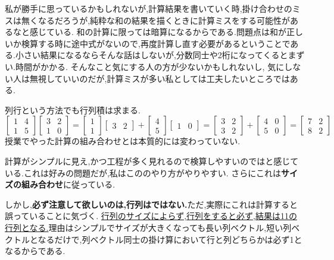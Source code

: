 私が勝手に思っているかもしれないが,計算結果を書いていく時,掛け合わせのミスは無くなるだろうが,純粋な和の結果を描くときに計算ミスをする可能性があるなと感じている.
和の計算に限っては暗算になるからである.問題点は和が正しいか検算する時に途中式がないので,再度計算し直す必要があるということである.小さい結果になるならそんな話はしないが,分数同士や2桁になってくるとまずい.時間がかかる.
そんなこと気にする人の方が少ないかもしれないし,
気にしない人は無視していいのだが,計算ミスが多い私としては工夫したいところではある.\medskip\\
\begin{framed}
列\times 行という方法でも行列積は求まる.\\
\[
\begin{bmatrix}
    1 & 4 \\ 1 & 5 
\end{bmatrix}
\begin{bmatrix}
    3 & 2 \\ 1 & 0
\end{bmatrix}
=
\begin{bmatrix}
    1 \\ 1
\end{bmatrix}
\begin{bmatrix}
    3 & 2
\end{bmatrix}
+
\begin{bmatrix}
    4 \\ 5
\end{bmatrix}
\begin{bmatrix}
    1 & 0
\end{bmatrix}
=
\begin{bmatrix}
    3 & 2 \\ 3 & 2
\end{bmatrix}
+
\begin{bmatrix}
    4 & 0 \\ 5 & 0
\end{bmatrix}
=
\begin{bmatrix}
    7 & 2 \\ 8 & 2
\end{bmatrix}
\]
授業でやった計算の組み合わせとは本質的には変わっていない.
\end{framed}
計算がシンプルに見え,かつ工程が多く見れるので検算しやすいのではと感じている.これは好みの問題だが,私はこののやり方がやりやすい.
さらにこれは\textbf{サイズの組み合わせ}に従っている.

しかし,\textbf{必ず注意して欲しいのは,行\times 列はではない.}ただ,実際にこれは計算すると誤っていることに気づく.
\underline{行列のサイズによらず,行\times 列をすると必ず,結果は1\times1の行列となる.}理由はシンプルでサイズが大きくなっても長い列ベクトル,短い列ベクトルとなるだけで,列ベクトル同士の掛け算において行と列どちらかは必ず1となるからである.
